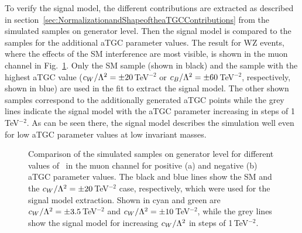 \noindent To verify the signal model, the different contributions are extracted as described in section~\ref{sec:NormalizationandShapeoftheaTGCContributions} from the simulated samples on generator level. Then the signal model is compared to the samples for the additional aTGC parameter values. The result for WZ events, where the effects of the SM interference are most visible, is shown in the muon channel in Fig.~\ref{fig:signal:smintverif_WZ_mu}. Only the SM sample (shown in black) and the sample with the highest aTGC value ($c_{W}/\Lambda^2 = \pm 20$\,TeV$^{-2}$ or $c_{B}/\Lambda^2 = \pm 60$\,TeV$^{-2}$, respectively, shown in blue) are used in the fit to extract the signal model. The other shown samples correspond to the additionally generated aTGC points while the  grey lines indicate the signal model with the aTGC parameter increasing in steps of 1\,TeV$^{-2}$. As can be seen there, the signal model describes the simulation well even for low aTGC parameter values at low invariant masses.

\begin{figure}[bh!]
	\centering
	\caption[Comparison of the simulated samples on generator level for different values of \Tccw \ in the muon channel]{Comparison of the simulated samples on generator level for different values of \Tccw \ in the muon channel for positive (a) and negative (b) aTGC parameter values. The black and blue lines show the SM and the $c_{W}/\Lambda^2 = \pm 20$\,TeV$^{-2}$ case, respectively, which were used for the signal model extraction. Shown in cyan and green are $c_{W}/\Lambda^2 = \pm 3.5$\,TeV$^{-2}$ and $c_{W}/\Lambda^2 = \pm 10$\,TeV$^{-2}$, while the grey lines show the signal model for increasing $c_{W}/\Lambda^2$ in steps of 1\,TeV$^{-2}$.}
	\label{fig:signal:smintverif_WZ_mu}
\end{figure}